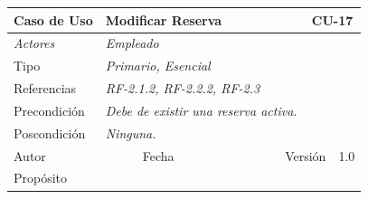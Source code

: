 \begin{table}[H]
    \begin{tabular}{|llllllll|}
    \hline
    \multicolumn{1}{|l|}{\cellcolor[HTML]{F2F2F2}Caso de Uso}           & \multicolumn{5}{l|}{Modificar Reserva}                                                                       & \multicolumn{2}{l|}{\cellcolor[HTML]{E6E6E6}CU-17}             \\ \hline
    \multicolumn{1}{|l|}{{\color[HTML]{808080} \textit{Actores}}}       & \multicolumn{7}{l|}{{\color[HTML]{808080} \textit{Empleado}}}                                                                                                      \\ \hline
    \multicolumn{1}{|l|}{Tipo}                                          & \multicolumn{7}{l|}{{\color[HTML]{808080} \textit{Primario, Esencial}}}                                                                                                                           \\ \hline
    \multicolumn{1}{|l|}{Referencias}                                   & \multicolumn{3}{l|}{{\color[HTML]{808080} \textit{RF-2.1.2, RF-2.2.2, RF-2.3}}}                & \multicolumn{4}{l|}{}                                                                  \\ \hline
    \multicolumn{1}{|l|}{Precondici\'on}                                  & \multicolumn{7}{l|}{{\color[HTML]{808080} \textit{Debe de existir una reserva activa.}}}                                                                                                      \\ \hline
    \multicolumn{1}{|l|}{Poscondici\'on}                                  & \multicolumn{7}{l|}{{\color[HTML]{808080} \textit{Ninguna.}}}                                                                                                                                                                             \\ \hline
    \multicolumn{1}{|l|}{Autor}                                         & \multicolumn{1}{l|}{}                         & \multicolumn{2}{l|}{Fecha}             & \multicolumn{1}{l|}{}        & \multicolumn{2}{l|}{Versi\'on}             & 1.0                            \\ \hline
    \multicolumn{8}{|l|}{Prop\'osito}                                                                                                                                                                                                                                         \\ \hline

\end{tabular}
\end{table}
